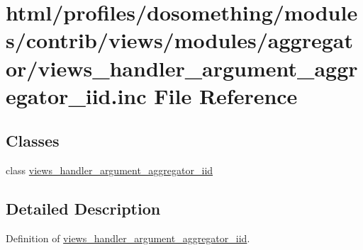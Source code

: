 \hypertarget{views__handler__argument__aggregator__iid_8inc}{
\section{html/profiles/dosomething/modules/contrib/views/modules/aggregator/views\_\-handler\_\-argument\_\-aggregator\_\-iid.inc File Reference}
\label{views__handler__argument__aggregator__iid_8inc}
}
\subsection*{Classes}
\begin{DoxyCompactItemize}
\item 
class \hyperlink{classviews__handler__argument__aggregator__iid}{views\_\-handler\_\-argument\_\-aggregator\_\-iid}
\end{DoxyCompactItemize}


\subsection{Detailed Description}
Definition of \hyperlink{classviews__handler__argument__aggregator__iid}{views\_\-handler\_\-argument\_\-aggregator\_\-iid}. 